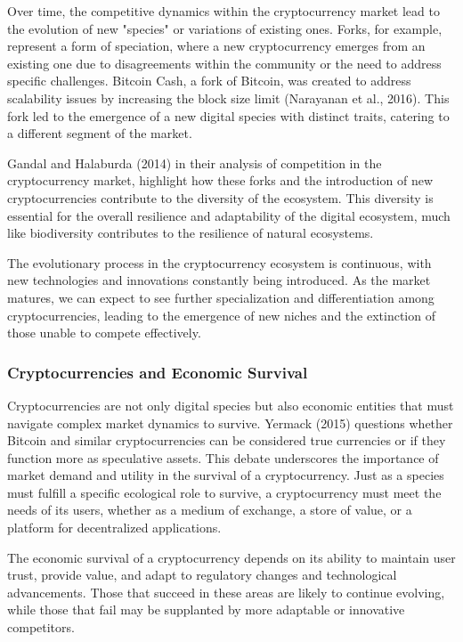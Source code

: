 \documentclass[12pt,twoside]{article}
\begin{document}
Over time, the competitive dynamics within the cryptocurrency market lead to the evolution of new "species" or variations of existing ones. Forks, for example, represent a form of speciation, where a new cryptocurrency emerges from an existing one due to disagreements within the community or the need to address specific challenges. Bitcoin Cash, a fork of Bitcoin, was created to address scalability issues by increasing the block size limit (Narayanan et al., 2016). This fork led to the emergence of a new digital species with distinct traits, catering to a different segment of the market.

Gandal and Halaburda (2014) in their analysis of competition in the cryptocurrency market, highlight how these forks and the introduction of new cryptocurrencies contribute to the diversity of the ecosystem. This diversity is essential for the overall resilience and adaptability of the digital ecosystem, much like biodiversity contributes to the resilience of natural ecosystems.

The evolutionary process in the cryptocurrency ecosystem is continuous, with new technologies and innovations constantly being introduced. As the market matures, we can expect to see further specialization and differentiation among cryptocurrencies, leading to the emergence of new niches and the extinction of those unable to compete effectively.

\subsubsection{Cryptocurrencies and Economic Survival}

Cryptocurrencies are not only digital species but also economic entities that must navigate complex market dynamics to survive. Yermack (2015) questions whether Bitcoin and similar cryptocurrencies can be considered true currencies or if they function more as speculative assets. This debate underscores the importance of market demand and utility in the survival of a cryptocurrency. Just as a species must fulfill a specific ecological role to survive, a cryptocurrency must meet the needs of its users, whether as a medium of exchange, a store of value, or a platform for decentralized applications.

The economic survival of a cryptocurrency depends on its ability to maintain user trust, provide value, and adapt to regulatory changes and technological advancements. Those that succeed in these areas are likely to continue evolving, while those that fail may be supplanted by more adaptable or innovative competitors.
\end{document}
